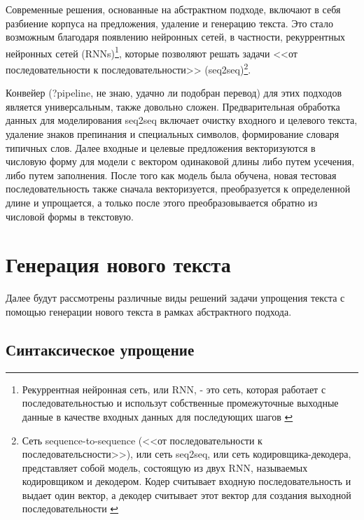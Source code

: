 Современные решения, основанные на абстрактном подходе,  включают в себя разбиение корпуса на предложения, удаление и генерацию текста. Это стало возможным благодаря появлению нейронных сетей, в частности, рекуррентных нейронных сетей (RNNs)\footnote{Рекуррентная нейронная сеть, или RNN, - это сеть, которая работает с последовательностью и использут собственные промежуточные выходные данные в качестве входных данных для последующих шагов \cite{noauthor_nlp_nodate}}, которые позволяют решать задачи <<от последовательности к последовательности>> (seq2seq)\footnote{Сеть sequence-to-sequence (<<от последовательности к последовательсности>>), или сеть seq2seq, или сеть кодировщика-декодера, представляет собой модель, состоящую из двух RNN, называемых кодировщиком и декодером. Кодер считывает входную последовательность и выдает один вектор, а декодер считывает этот вектор для создания выходной последовательности \cite{noauthor_nlp_nodate}}.

Конвейер (?pipeline, не знаю, удачно ли подобран перевод) для этих подходов является универсальным, также довольно сложен. Предварительная обработка данных для моделирования seq2seq включает очистку входного и целевого текста, удаление знаков препинания и специальных символов, формирование словаря типичных слов. Далее входные и целевые предложения векторизуются в числовую форму для модели с вектором одинаковой длины либо путем усечения, либо путем заполнения. После того как модель была обучена, новая тестовая последовательность также сначала векторизуется, преобразуется к определенной длине и упрощается, а только после этого преобразовывается обратно из числовой формы в текстовую.


\section{Генерация нового текста}

Далее будут рассмотрены различные виды решений задачи упрощения текста с помощью генерации нового текста в рамках абстрактного подхода.

\subsection{Синтаксическое упрощение}







